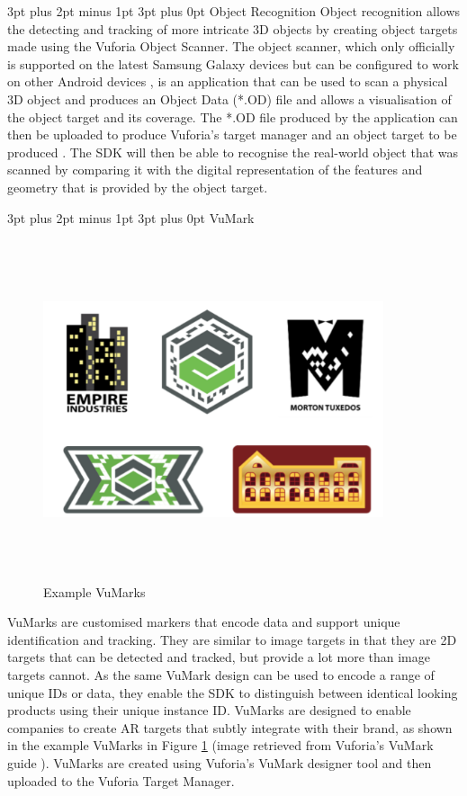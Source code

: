 \documentclass[12pt,a4paper]{article}
\makeatletter
\renewcommand\paragraph{\@startsection {paragraph}{1}{0mm} %
	                           {3pt plus 2pt minus 1pt} %
	                           {3pt plus 0pt} %
	                           {\normalfont}}
\makeatother
\begin{document}
\paragraph{Object Recognition}
Object recognition allows the detecting and tracking of more intricate 3D objects by creating object targets made using the Vuforia Object Scanner. The object scanner, which only officially is supported on the latest Samsung Galaxy devices but can be configured to work on other Android devices \cite{vuforiasupportedversions}, is an application that can be used to scan a physical 3D object and produces an Object Data (*.OD) file and allows a visualisation of the object target and its coverage. The *.OD file produced by the application can then be uploaded to produce Vuforia's target manager and an object target to be produced \cite{vuforiaobjectreco}. The SDK will then be able to recognise the real-world object that was scanned by comparing it with the digital representation of the features and geometry that is provided by the object target.

\paragraph{VuMark}

\begin{figure}[!h]
	\centering
	\includegraphics[width=10cm,height=10cm,keepaspectratio]{images/examplevumarks}
	\caption{Example VuMarks}
	\label{fig_vumark}
\end{figure}

VuMarks are customised markers that encode data and support unique identification and tracking. They are similar to image targets in that they are 2D targets that can be detected and tracked, but provide a lot more than image targets cannot. As the same VuMark design can be used to encode a range of unique IDs or data, they enable the SDK to distinguish between identical looking products using their unique instance ID. VuMarks are designed to enable companies to create AR targets that subtly integrate with their brand, as shown in the example VuMarks in Figure \ref{fig_vumark} (image retrieved from Vuforia's VuMark guide \cite{vuforiavumark}). VuMarks are created using Vuforia's VuMark designer tool and then uploaded to the Vuforia Target Manager.
\end{document}

